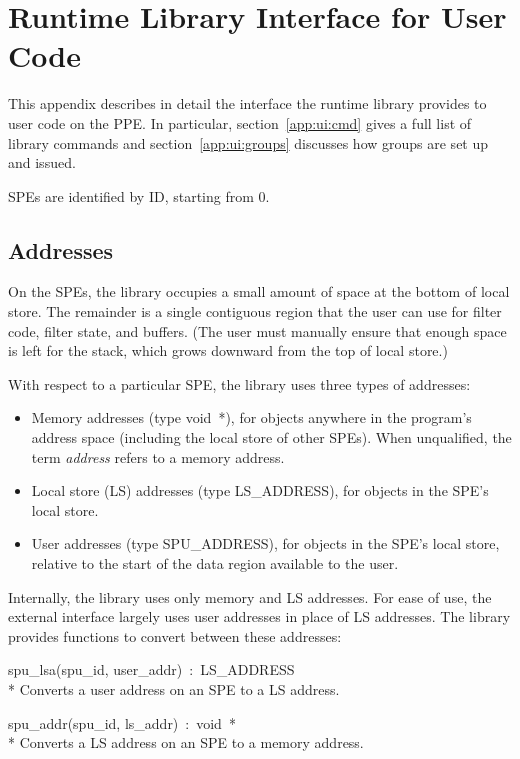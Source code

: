 \chapter{Runtime Library Interface for User Code}\label{app:ui}

This appendix describes in detail the interface the runtime library provides to user code on the PPE. In particular, section~\ref{app:ui:cmd} gives a full list of library commands and section~\ref{app:ui:groups} discusses how groups are set up and issued.

SPEs are identified by ID, starting from 0.

\section{Addresses}

On the SPEs, the library occupies a small amount of space at the bottom of local store. The remainder is a single contiguous region that the user can use for filter code, filter state, and buffers. (The user must manually ensure that enough space is left for the stack, which grows downward from the top of local store.)

With respect to a particular SPE, the library uses three types of addresses:
\begin{itemize}
\item Memory addresses (type \textsf{void~*}), for objects anywhere in the program's address space (including the local store of other SPEs). When unqualified, the term \emph{address} refers to a memory address.
\item Local store (LS) addresses (type \textsf{LS\_ADDRESS}), for objects in the SPE's local store.
\item User addresses (type \textsf{SPU\_ADDRESS}), for objects in the SPE's local store, relative to the start of the data region available to the user.
\end{itemize}

Internally, the library uses only memory and LS addresses. For ease of use, the external interface largely uses user addresses in place of LS addresses. The library provides functions to convert between these addresses:
\begin{description}
\item \textsf{spu\_lsa(spu\_id, user\_addr)~:~LS\_ADDRESS} \\*
Converts a user address on an SPE to a LS address.

\item \textsf{spu\_addr(spu\_id, ls\_addr)~:~void~*} \\*
Converts a LS address on an SPE to a memory address.
\end{description}

